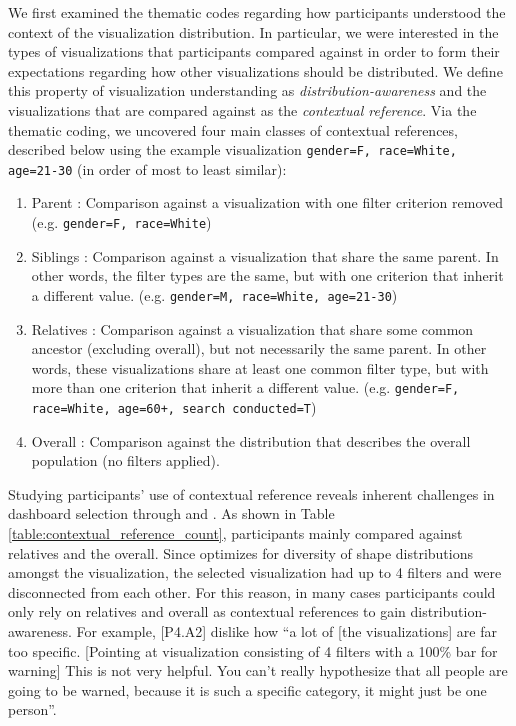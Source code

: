 \par We first examined the thematic codes regarding how participants understood the context of the visualization distribution. In particular, we were interested in the types of visualizations that participants compared against in order to form their expectations regarding how other visualizations should be distributed. We define this property of visualization understanding as \textit{distribution-awareness} and the visualizations that are compared against as the \textit{contextual reference}. Via the thematic coding, we uncovered four main classes of contextual references, described below using the example visualization \texttt{gender=F, race=White, age=21-30} (in order of most to least similar):
\begin{enumerate}
	\item Parent : Comparison against a visualization with one filter criterion removed (e.g. \texttt{gender=F, race=White})
	\item Siblings : Comparison against a visualization that share the same parent. In other words, the filter types are the same, but with one criterion that inherit a different value. (e.g. \texttt{gender=M, race=White, age=21-30})
	\item Relatives : Comparison against a visualization that share some common ancestor (excluding overall), but not necessarily the same parent. In other words, these visualizations share at least one common filter type, but with more than one criterion that inherit a different value. (e.g. \texttt{gender=F, race=White, age=60+, search conducted=T})
	\item Overall : Comparison against the distribution that describes the overall population (no filters applied).
\end{enumerate}
Studying participants' use of contextual reference reveals inherent challenges in dashboard selection through \BFS and \cluster. As shown in Table \ref{table:contextual_reference_count}, participants mainly compared against relatives and the overall. Since \cluster optimizes for diversity of shape distributions amongst the visualization, the selected visualization had up to 4 filters and were disconnected from each other. For this reason, in many cases participants could only rely on relatives and overall as contextual references to gain distribution-awareness. For example, [P4.A2] dislike how ``a lot of [the visualizations] are far too specific. [Pointing at visualization consisting of 4 filters with a 100\% bar for warning] This is not very helpful. You can't really hypothesize that all people are going to be warned, because it is such a specific category, it might just be one person''. %
